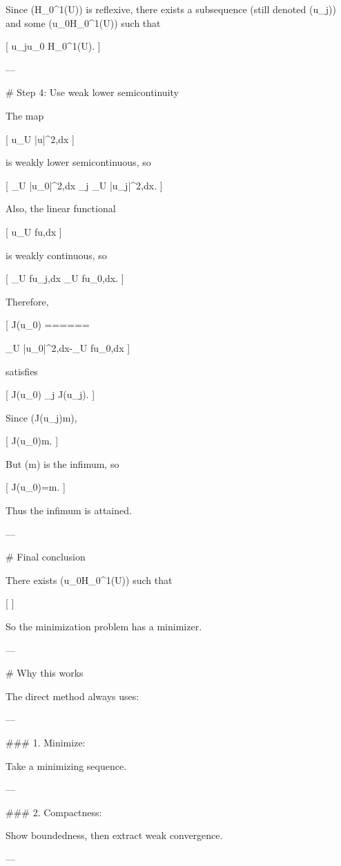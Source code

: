 Since (H_0^1(U)) is reflexive, there exists a subsequence (still denoted (u_j)) and some (u_0\in H_0^1(U)) such that

[
u_j\rightharpoonup u_0
\qquad{}H_0^1(U).
]

---

# Step 4: Use weak lower semicontinuity

The map

[
u\mapsto \int_U |\nabla u|^2,dx
]

is weakly lower semicontinuous, so

[
\int_U |\nabla u_0|^2,dx
\le
\liminf_{j\to\infty}
\int_U |\nabla u_j|^2,dx.
]

Also, the linear functional

[
u\mapsto \int_U fu,dx
]

is weakly continuous, so

[
\int_U fu_j,dx
\to
\int_U fu_0,dx.
]

Therefore,

[
J(u_0)
======

\int_U |\nabla u_0|^2,dx-\int_U fu_0,dx
]

satisfies

[
J(u_0)
\le
\liminf_{j\to\infty}
J(u_j).
]

Since (J(u_j)\to m),

[
J(u_0)\le m.
]

But (m) is the infimum, so

[
J(u_0)=m.
]

Thus the infimum is attained.

---

# Final conclusion

There exists (u_0\in H_0^1(U)) such that

[
]

So the minimization problem has a minimizer.

---

# Why this works

The direct method always uses:

---

### 1. Minimize:

Take a minimizing sequence.

---

### 2. Compactness:

Show boundedness, then extract weak convergence.

---

